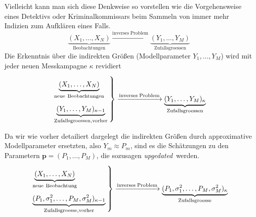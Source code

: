 \begin{enumerate}
Vielleicht kann man sich diese Denkweise so vorstellen wie die Vorgehensweise eines Detektivs
oder Kriminalkommissars beim Sammeln von immer mehr Indizien zum Aufklären eines Falls.
\begin{equation}
\underbrace{(X_1, \dots, X_N)}_{\mathrm{Beobachtungen}} \xrightarrow{\mathrm{inverses \; Problem}}
\underbrace{(Y_1, \dots, Y_M)}_{\mathrm{Zufallsgroessen}}
\end{equation}
Die Erkenntnis über die indirekten Größen (Modellparameter $Y_1, \dots, Y_M$) wird mit jeder
neuen Messkampagne $\kappa$ revidiert
\begin{equation}
\arraycolsep=2.4pt\def\arraystretch{2}
\left.
\begin{array}{l}
\underbrace{(X_1, \dots, X_N)}_{\mathrm{neue~Beobachtungen}}\\
\underbrace{(Y_1, \dots, Y_M)_{\kappa-1}}_{\mathrm{Zufallsgroessen, vorher}}
\end{array}\right\}
 \xrightarrow{\mathrm{inverses \; Problem}}
\underbrace{(Y_1, \dots, Y_M)_{\kappa}}_{\mathrm{Zufallsgroessen}}
\end{equation}
\end{enumerate}
Da wir wie vorher detailiert dargelegt die indirekten Größen durch approximative Modellparameter ersetzten,
also $Y_m \approx P_m$, sind es die Schätzungen zu den Parametern $\mathbf{p} = (P_1,\dots,P_M)$, die
sozusagen \glqq\textsl{upgedated}\grqq ~werden.
\begin{equation}
\arraycolsep=2.4pt\def\arraystretch{2}
\left.
\begin{array}{l}
\underbrace{(X_1, \dots, X_N)}_{\mathrm{neue~Beobachtung}}\\
\underbrace{(P_1, \sigma^2_1, \dots, P_M, \sigma^2_M)_{\kappa-1}}_{\mathrm{Zufallsgroesse, vorher}}
\end{array}\right\}
 \xrightarrow{\mathrm{inverses \; Problem}}
\underbrace{(P_1, \sigma^2_1, \dots, P_M, \sigma^2_M)_{\kappa}}_{\mathrm{Zufallsgroesse}}
\end{equation}

